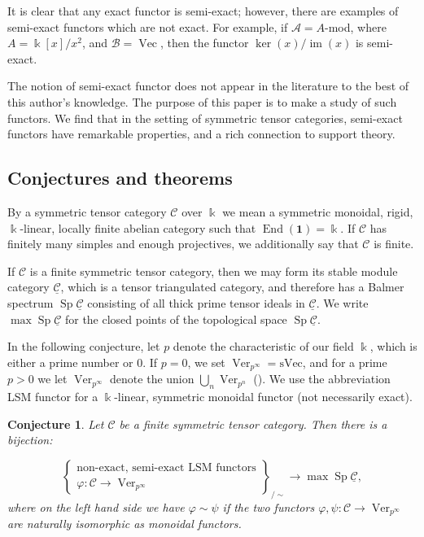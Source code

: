 \documentclass[11pt]{amsart}
\def\End{\operatorname{End}}
\def\ker{\operatorname{ker}}
\def\Cs{\mathcal{C}}
\def\As{\mathscr{A}}
\def\Bs{\mathscr{B}}
\def\Cs{\mathscr{C}}
\def\Ver{\operatorname{Ver}}
\def\Vec{\operatorname{Vec}}
\def\ul{\underline}
\def\sVec{\text{sVec}}
\def\Sp{\operatorname{Sp}}
\newtheorem{conj}[thm]{Conjecture}
\theoremstyle{definition}
\theoremstyle{remark}
\numberwithin{equation}{section}
\begin{document}
It is clear that any exact functor is semi-exact; however, there are examples of semi-exact functors which are not exact.  For example, if $\As=A$-mod, where $A=\Bbbk[x]/x^2$, and $\Bs=\Vec$, then the functor $\ker(x)/\operatorname{im}(x)$ is semi-exact.

The notion of semi-exact functor does not appear in the literature to the best of this author's knowledge. The purpose of this paper is to make a study of such functors.  We find that in the setting of symmetric tensor categories, semi-exact functors have remarkable properties, and a rich connection to support theory.

\subsection{Conjectures and theorems}  By a symmetric tensor category $\Cs$ over $\Bbbk$ we mean a symmetric monoidal, rigid, $\Bbbk$-linear, locally finite abelian category such that $\End(\mathbf{1})=\Bbbk$.  If $\Cs$ has finitely many simples and enough projectives, we additionally say that $\Cs$ is finite.

If $\Cs$ is a finite symmetric tensor category, then we may form its stable module category $\underline{\Cs}$, which is a tensor triangulated category, and therefore has a Balmer spectrum $\Sp\underline{\Cs}$ consisting of all thick prime tensor ideals in $\underline{\Cs}$.  We write $\max\Sp\underline{\Cs}$ for the closed points of the topological space $\Sp\underline{\Cs}$.

In the following conjecture, let $p$ denote the characteristic of our field $\Bbbk$, which is either a prime number or $0$.  If $p=0$, we set $\Ver_{p^\infty}=\sVec$, and for a prime $p>0$ we let $\Ver_{p^\infty}$ denote the union $\bigcup\limits_{n}\Ver_{p^n}$ (\cite{BEO}).  We use the abbreviation LSM functor for a $\Bbbk$-linear, symmetric monoidal functor (not necessarily exact).



\begin{conj}\label{conj 1}
    Let $\Cs$ be a finite symmetric tensor category.  Then there is a bijection:
  
  
\[
\left\{
\begin{array}{c}
    \text{non-exact, semi-exact LSM functors}  \\
      \varphi:\Cs\to\Ver_{p^\infty}
\end{array}
\right\}_{\bigg/\sim} \longrightarrow \operatorname{max}\operatorname{Sp}\ul{\Cs},
\]
where on the left hand side we have $\varphi\sim\psi$ if the two functors $\varphi,\psi:\Cs\to\Ver_{p^\infty}$ are naturally isomorphic as monoidal functors.


\end{conj}
\end{document}
